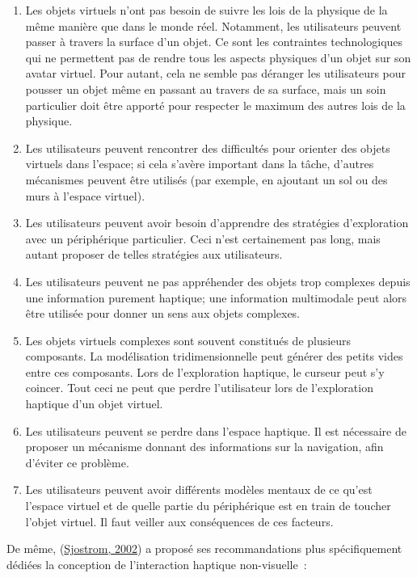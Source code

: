 \documentclass[
]{book}
\providecommand{\tightlist}{%
  \setlength{\itemsep}{0pt}\setlength{\parskip}{0pt}}
\begin{document}
\begin{enumerate}
\def\labelenumi{\arabic{enumi}.}
\setcounter{enumi}{4}
\tightlist
\item
  Les objets virtuels n'ont pas besoin de suivre les
  lois de la physique de la même manière que dans le monde réel. Notamment,
  les utilisateurs peuvent passer à travers la surface d'un objet. Ce sont
  les contraintes technologiques qui ne permettent pas de rendre tous les
  aspects physiques d'un objet sur son avatar virtuel. Pour autant, cela ne
  semble pas déranger les utilisateurs pour pousser un objet même en passant
  au travers de sa surface, mais un soin particulier doit être apporté pour
  respecter le maximum des autres lois de la physique.
\item
  Les utilisateurs peuvent rencontrer des
  difficultés pour orienter des objets virtuels dans l'espace; si cela
  s'avère important dans la tâche, d'autres mécanismes peuvent être utilisés
  (par exemple, en ajoutant un sol ou des murs à l'espace virtuel).
\item
  Les utilisateurs peuvent avoir besoin d'apprendre
  des stratégies d'exploration avec un périphérique particulier. Ceci n'est
  certainement pas long, mais autant proposer de telles stratégies aux
  utilisateurs.
\item
  Les utilisateurs peuvent ne pas appréhender des
  objets trop complexes depuis une information purement haptique; une
  information multimodale peut alors être utilisée pour donner un sens aux
  objets complexes.
\item
  Les objets virtuels complexes sont souvent
  constitués de plusieurs composants. La modélisation tridimensionnelle peut
  générer des petits vides entre ces composants. Lors de l'exploration
  haptique, le curseur peut s'y coincer. Tout ceci ne peut que perdre
  l'utilisateur lors de l'exploration haptique d'un objet virtuel.
\item
  Les utilisateurs peuvent se perdre dans l'espace
  haptique. Il est nécessaire de proposer un mécanisme donnant des
  informations sur la navigation, afin d'éviter ce problème.
\item
  Les utilisateurs peuvent avoir différents modèles
  mentaux de ce qu'est l'espace virtuel et de quelle partie du périphérique
  est en train de toucher l'objet virtuel. Il faut veiller aux conséquences
  de ces facteurs.
\end{enumerate}

De même, (\protect\hyperlink{ref-sjostrom2002non}{Sjostrom, 2002}) a proposé
ses recommandations plus spécifiquement dédiées la conception de
l'interaction haptique non-visuelle~:
\end{document}
